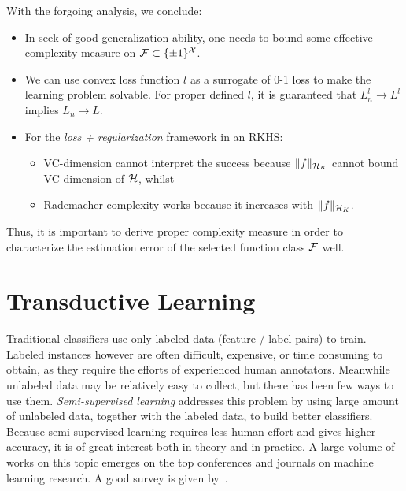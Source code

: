 \begin{remark} \label{rmk:vc-fails}
With the forgoing analysis, we conclude: %
\begin{itemize}
  \item In seek of good generalization ability, one needs to bound some effective complexity measure
        on ${\cal F}\subset\{\pm1\}^{\cal X}$. %
  \item We can use convex loss function $l$ as a surrogate of 0-1 loss to make the learning problem solvable. For
        proper defined $l$, it is guaranteed that $L^l_n\rightarrow L^l$
        implies $L_n\rightarrow L$.
  \item For the {\em loss + regularization} framework in an RKHS: %
      \begin{itemize}
        \item VC-dimension cannot interpret the success because $\|f\|_{{\cal H}_K}$ cannot bound
            VC-dimension of ${\cal H}$, whilst %
        \item Rademacher complexity works because it increases with $\|f\|_{{\cal H}_K}$.
      \end{itemize}
\end{itemize}

Thus, it is important to derive proper complexity measure in order to characterize the
estimation error of the selected function class ${\cal F}$ well.

\end{remark}

\section{Transductive Learning}

Traditional classifiers use only labeled data (feature / label pairs) to
train. Labeled instances however are often difficult, expensive, or time consuming to obtain, as they require the efforts of experienced human annotators. Meanwhile unlabeled data may be relatively easy to collect, but there has been few ways to use them. {\em Semi-supervised learning} addresses this problem by using large amount of unlabeled data, together with the labeled data, to build better classifiers. Because semi-supervised learning requires less human effort and gives higher accuracy, it is of great interest both in theory and in practice. A large volume of works on this topic emerges on the top conferences and journals on machine learning research. A good survey is given by~\cite{tr/Zhu05}.

